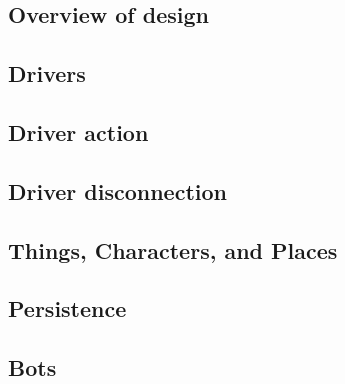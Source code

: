 \subsection{Overview of design}
\label{server-impl:overview}


\subsection{Drivers}
\label{sec:server-impl:drivers}


\subsection{Driver action}
\label{sec:server-impl:driver-action}


\subsection{Driver disconnection}
\label{sec:server-impl:driver-disconnection}


\subsection{Things, Characters, and Places}
\label{sec:server-impl:objects}


\subsection{Persistence}
\label{sec:server-impl:persistence}


\subsection{Bots}
\label{sec:server-impl:bots}

